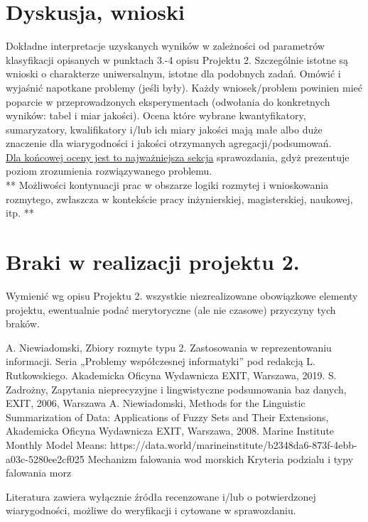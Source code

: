 \documentclass{article}
\begin{document}


\section{Dyskusja, wnioski}
Dokładne interpretacje uzyskanych wyników w zależności od parametrów klasyfikacji
opisanych w punktach 3.-4 opisu Projektu 2. 
Szczególnie istotne są wnioski o charakterze uniwersalnym, istotne dla podobnych zadań. 
Omówić i wyjaśnić napotkane problemy (jeśli były). Każdy wniosek/problem powinien mieć poparcie
w przeprowadzonych eksperymentach (odwołania do konkretnych wyników: tabel i miar
jakości). Ocena które wybrane kwantyfikatory, sumaryzatory, kwalifikatory i/lub ich
miary jakości mają małe albo duże znaczenie dla wiarygodności i jakości otrzymanych
agregacji/podsumowań.  \\
\underline{Dla końcowej oceny jest to najważniejsza sekcja} sprawozdania, gdyż prezentuje poziom
zrozumienia rozwiązywanego problemu.\\

** Możliwości kontynuacji prac w obszarze logiki rozmytej i wnioskowania rozmytego, zwłaszcza w kontekście pracy inżynierskiej,
magisterskiej, naukowej, itp. **\\



\section{Braki w realizacji projektu 2.}
Wymienić wg opisu Projektu 2. wszystkie niezrealizowane obowiązkowe elementy projektu, ewentualnie
podać merytoryczne (ale nie czasowe) przyczyny tych braków. 


\begin{thebibliography}{99}
  A. Niewiadomski, Zbiory rozmyte typu 2. Zastosowania w reprezentowaniu informacji.  Seria „Problemy współczesnej informatyki” pod redakcją L. Rutkowskiego. Akademicka Oficyna Wydawnicza EXIT, Warszawa, 2019.
 S. Zadrożny, Zapytania nieprecyzyjne i lingwistyczne podsumowania baz danych, EXIT, 2006, Warszawa
 A. Niewiadomski, Methods for the Linguistic Summarization of Data: Applications of Fuzzy Sets and Their Extensions, Akademicka Oficyna Wydawnicza EXIT, Warszawa, 2008.
 Marine Institute Monthly Model Means: https://data.world/marineinstitute/b2348da6-873f-4ebb-a03c-5280ee2cf025
 Mechanizm falowania wod morskich Kryteria podzialu i typy falowania morz
\end{thebibliography}

Literatura zawiera wyłącznie źródła recenzowane i/lub o potwierdzonej wiarygodności,
możliwe do weryfikacji i cytowane w sprawozdaniu. 
\end{document}
